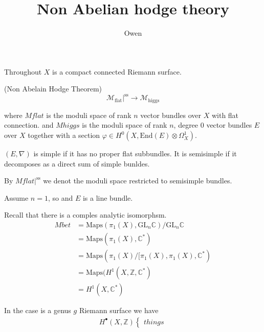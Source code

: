 % 

\title{Non Abelian hodge theory}
\author{Owen}
\date{}

 
\maketitle

Throughout $X$ is  a compact connected Riemann surface. 


\begin{theorem}
    (Non Abelain Hodge Theorem)
    \begin{equation}
        \mathcal{M}_{\mathrm{flat}}|^{\mathrm{ss}} \rightarrow  \mathcal{M}_{\mathrm{higgs}} 
    \end{equation}
\end{theorem}

where $Mflat$ is the moduli space of rank $n$ vector bundles over $X$ with flat connection. 
and $Mhiggs$ is the moduli space of rank $n$, degree $0$ vector bundles $E$ over $X$ together with a section $\varphi \in H^0 (X, \mathrm{End}(E) \otimes \Omega^1 _X) $. 

\begin{definition}
    $(E, \nabla)$ is simple if it has no proper flat subbundles. 
    It is semisimple if it decomposes as a direct sum of simple bunldes. 
\end{definition}
By $ Mflat|^{\mathrm{ss}} $ we denot the moduli space restricted to semisimple bundles. 

Assume $n=1$, so and $E$ is a line bundle. 

Recall that there is a comples analytic isomorphsm. 
\begin{align}
    Mbet & = \mathrm{Maps}(\pi_1 ( X) , \mathrm{GL}_n \mathbb{C} ) / \mathrm{GL}_n \mathbb{C}  \\
    & = \mathrm{Maps}(\pi_1 ( X) , \mathbb{C} ^*) \\
    & = \mathrm{Maps}(\pi_1 ( X)/[\pi_1(X) , \pi_1(X) , \mathbb{C} ^*) \\
    & = \mathrm{Maps}(H^1(X, \mathbb{Z} , \mathbb{C} ^*) \\
    & = H^1(X, \mathbb{C} ^*) 
\end{align}

In the case is a genus $g$ Riemann surface we have 
\begin{align}
    H^\bullet (X, \mathbb{Z} ) \begin{cases}
        things 
    \end{cases} 
\end{align}

